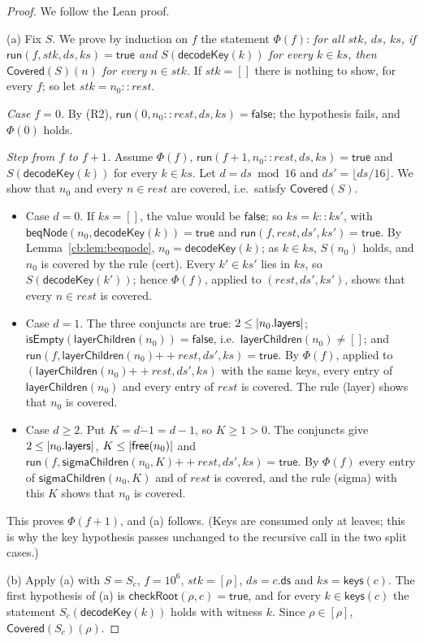 \begin{proof}
We follow the Lean proof.

(a) Fix $S$. We prove by induction on $f$ the statement $\Phi(f)$: \emph{for all $stk$, $ds$, $ks$, if
$\mathsf{run}(f,stk,ds,ks)=\mathsf{true}$ and $S(\mathsf{decodeKey}(k))$ for every $k\in ks$, then
$\mathsf{Covered}(S)(n)$ for every $n\in stk$.} If $stk=[]$ there is nothing to show, for every $f$; so let
$stk=n_0\mathbin{::}rest$.

\emph{Case $f=0$.} By (R2), $\mathsf{run}(0,n_0\mathbin{::}rest,ds,ks)=\mathsf{false}$; the hypothesis fails, and
$\Phi(0)$ holds.

\emph{Step from $f$ to $f+1$.} Assume $\Phi(f)$, $\mathsf{run}(f+1,n_0\mathbin{::}rest,ds,ks)=\mathsf{true}$ and
$S(\mathsf{decodeKey}(k))$ for every $k\in ks$. Let $d=ds\bmod16$ and $ds'=\lfloor ds/16\rfloor$. We show that $n_0$
and every $n\in rest$ are covered, i.e.\ satisfy $\mathsf{Covered}(S)$.
\begin{itemize}
\item Case $d=0$. If $ks=[]$, the value would be $\mathsf{false}$; so $ks=k\mathbin{::}ks'$, with
  $\mathsf{beqNode}(n_0,\mathsf{decodeKey}(k))=\mathsf{true}$ and $\mathsf{run}(f,rest,ds',ks')=\mathsf{true}$. By
  Lemma~\ref{cb:lem:beqnode}, $n_0=\mathsf{decodeKey}(k)$; as $k\in ks$, $S(n_0)$ holds, and $n_0$ is covered by the
  rule (cert). Every $k'\in ks'$ lies in $ks$, so $S(\mathsf{decodeKey}(k'))$; hence $\Phi(f)$, applied to
  $(rest,ds',ks')$, shows that every $n\in rest$ is covered.
\item Case $d=1$. The three conjuncts are $\mathsf{true}$: $2\le\lvert n_0.\mathsf{layers}\rvert$;
  $\mathsf{isEmpty}(\mathsf{layerChildren}(n_0))=\mathsf{false}$, i.e.\ $\mathsf{layerChildren}(n_0)\ne[]$; and
  $\mathsf{run}(f,\mathsf{layerChildren}(n_0)\mathbin{+\!\!+}rest,ds',ks)=\mathsf{true}$. By $\Phi(f)$, applied to
  $(\mathsf{layerChildren}(n_0)\mathbin{+\!\!+}rest,ds',ks)$ with the same keys, every entry of
  $\mathsf{layerChildren}(n_0)$ and every entry of $rest$ is covered. The rule (layer) shows that $n_0$ is covered.
\item Case $d\ge2$. Put $K=d\mathbin{\dot-}1=d-1$, so $K\ge1>0$. The conjuncts give $2\le\lvert n_0.\mathsf{layers}\rvert$,
  $K\le\lvert\mathsf{free}(n_0)\rvert$ and $\mathsf{run}(f,\mathsf{sigmaChildren}(n_0,K)\mathbin{+\!\!+}rest,ds',ks)=
  \mathsf{true}$. By $\Phi(f)$ every entry of $\mathsf{sigmaChildren}(n_0,K)$ and of $rest$ is covered, and the rule
  (sigma) with this $K$ shows that $n_0$ is covered.
\end{itemize}
This proves $\Phi(f+1)$, and (a) follows. (Keys are consumed only at leaves; this is why the key hypothesis passes
unchanged to the recursive call in the two split cases.)

(b) Apply (a) with $S=S_c$, $f=10^6$, $stk=[\rho]$, $ds=c.\mathsf{ds}$ and $ks=\mathsf{keys}(c)$. The first hypothesis
of (a) is $\mathsf{checkRoot}(\rho,c)=\mathsf{true}$, and for every $k\in\mathsf{keys}(c)$ the statement
$S_c(\mathsf{decodeKey}(k))$ holds with witness $k$. Since $\rho\in[\rho]$, $\mathsf{Covered}(S_c)(\rho)$.
\end{proof}

